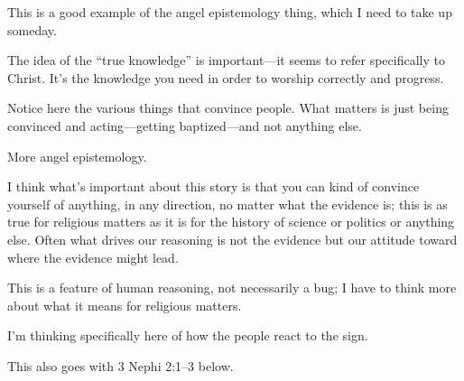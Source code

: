 \begin{compactdesc}
\begin{compactitem}
					\item This is a good example of the angel epistemology thing, which I need to take up someday.
				\end{compactitem}
			\item[{\hyperref[HELAMAN-14-28]{Helaman 14:28--31}}]
			\item[{\hyperref[HELAMAN-15-4]{Helaman 15:4--17}}] \phantom{.}
				\begin{compactitem}
					\item The idea of the ``true knowledge'' is important---it seems to refer specifically to Christ. It's the knowledge you need in order to worship correctly and progress.
				\end{compactitem} 
			\item[{\hyperref[HELAMAN-16-1]{Helaman 16:1--5}}] \phantom{.}
				\begin{compactitem}
					\item Notice here the various things that convince people. What matters is just being convinced and acting---getting baptized---and not anything else.
				\end{compactitem}
			\item[{\hyperref[HELAMAN-16-14]{Helaman 16:14}}] \phantom{.}
				\begin{compactitem}
					\item More angel epistemology.
				\end{compactitem}
			\item[{\hyperref[HELAMAN-16-15]{Helaman 16:15--23}}] \phantom{.}
				\begin{compactitem}
					\item I think what's important about this story is that you can kind of convince yourself of anything, in any direction, no matter what the evidence is; this is as true for religious matters as it is for the history of science or politics or anything else. Often what drives our reasoning is not the evidence but our attitude toward where the evidence might lead.
					\item This is a feature of human reasoning, not necessarily a bug; I have to think more about what it means for religious matters.
				\end{compactitem}
			\item[{\hyperref[3NEPHI-1-22]{3 Nephi 1:22}}] \phantom{.}
				\begin{compactitem}
					\item I'm thinking specifically here of how the people react to the sign.
					\item This also goes with 3 Nephi 2:1--3 below.

\end{compactitem}
\end{compactdesc}
